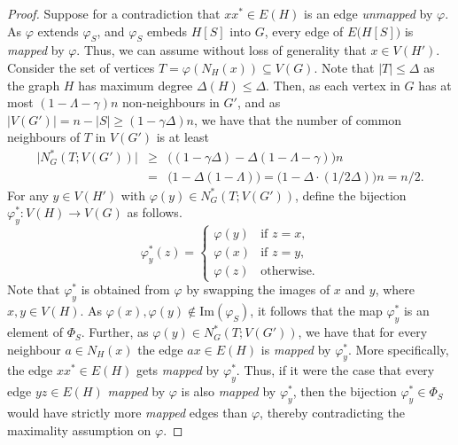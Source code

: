 \documentclass[final]{article}
\theoremstyle{definition}
\newcommand{\im}{\mathrm{Im}}
\begin{document}
\begin{proof}
    Suppose for a contradiction that $xx^* \in E(H)$ is an edge \emph{unmapped} by $\varphi$.
    As $\varphi$ extends $\varphi_S$, and $\varphi_S$ embeds $H[S]$ into $G$, every edge of $E\bigl(H[S]\bigr)$ is \emph{mapped} by $\varphi$. 
    Thus, we can assume without loss of generality that $x \in V(H')$. 
    Consider the set of vertices $T = \varphi(N_H(x)) \subseteq V(G)$. Note that $|T| \leq \Delta$ as the graph $H$ has maximum degree $\Delta(H) \leq \Delta$.
    Then, as each vertex in $G$ has at most $(1 - \Lambda - \gamma)n$ non-neighbours in $G'$, and as $|V(G')| = n - |S| \geq (1 - \gamma \Delta)n$, we have that
    the number of common neighbours of $T$ in $V(G')$ is at least 
    \begin{eqnarray*}
        \bigl|N^*_G(T; V(G'))\bigr| &\geq& \bigl((1-\gamma\Delta) - \Delta(1 - \Lambda - \gamma)\bigr)n\\
        &=&\bigl(1 - \Delta(1 - \Lambda)\bigr) = \bigl(1 - \Delta\cdot (1/2\Delta)\bigr)n = n/2.
    \end{eqnarray*}
    For any $y \in V(H')$ with $\varphi(y) \in N^*_G(T; V(G'))$, define the bijection $\varphi_y^*: V(H) \to V(G)$ as follows. 
    $$\varphi^*_y(z) = 
    \begin{cases}
        \varphi(y) & \text{if }z = x,\\
        \varphi(x) & \text{if }z = y,\\
        \varphi(z) & \text{otherwise.}
    \end{cases}$$
    \indent Note that $\varphi_y^*$ is obtained from $\varphi$ by swapping the images of $x$ and $y$, where $x,y \in V(H)$. 
    As $\varphi(x), \varphi(y) \notin \im(\varphi_S)$, it follows that the map $\varphi_y^*$ is an element of $\Phi_S$. 
    Further, as $\varphi(y) \in N^*_G(T; V(G'))$, we have that for every neighbour $a \in N_H(x)$ the edge $ax \in E(H)$ is \emph{mapped} by $\varphi_y^*$. More  specifically, the edge $xx^* \in E(H)$ gets \emph{mapped} by $\varphi_y^*$.
    Thus, if it were the case that every edge $yz \in E(H)$ \emph{mapped} by $\varphi$ is also \emph{mapped} by $\varphi_y^*$, 
    then the bijection $\varphi_y^* \in \Phi_S$ would have strictly more \emph{mapped} edges than $\varphi$, thereby contradicting the maximality assumption on $\varphi$. 


\end{proof}
\end{document}
